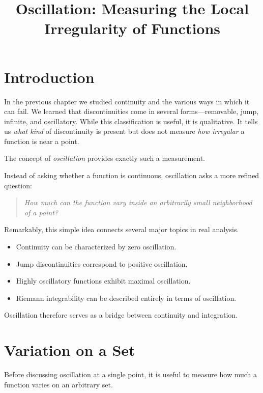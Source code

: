 \documentclass{essay}
\title{Oscillation: Measuring the Local Irregularity of Functions}
\author{}
\date{}
\begin{document}
\maketitle


\section{Introduction}

In the previous chapter we studied continuity and the various ways in which it
can fail. We learned that discontinuities come in several forms---removable,
jump, infinite, and oscillatory. While this classification is useful, it is
qualitative. It tells us \emph{what kind} of discontinuity is present but does
not measure \emph{how irregular} a function is near a point.

The concept of \emph{oscillation} provides exactly such a measurement.

Instead of asking whether a function is continuous, oscillation asks a more
refined question:

\begin{quote}
  \emph{How much can the function vary inside an arbitrarily small neighborhood
  of a point?}
\end{quote}

Remarkably, this simple idea connects several major topics in real analysis.

\begin{itemize}
  \item Continuity can be characterized by zero oscillation.
  \item Jump discontinuities correspond to positive oscillation.
  \item Highly oscillatory functions exhibit maximal oscillation.
  \item Riemann integrability can be described entirely in terms of oscillation.
\end{itemize}

Oscillation therefore serves as a bridge between continuity and integration.


\section{Variation on a Set}

Before discussing oscillation at a single point, it is useful to measure how
much a function varies on an arbitrary set.
\end{document}
